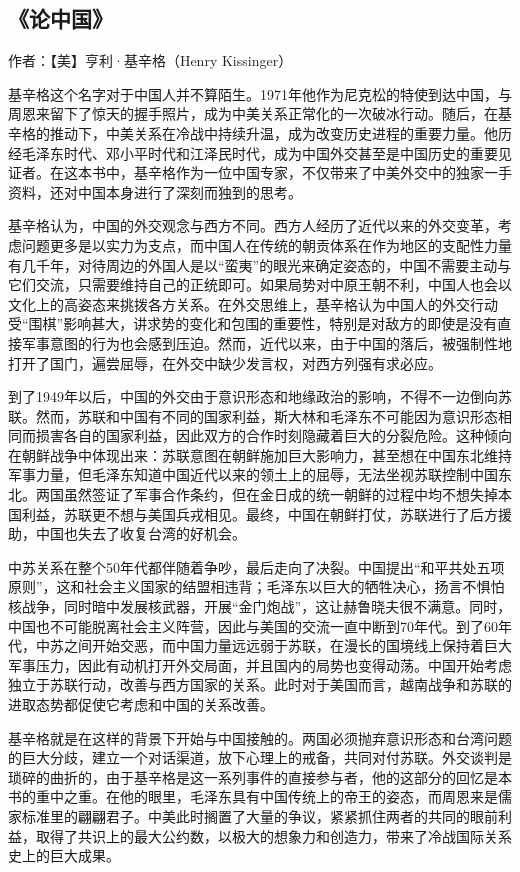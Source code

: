 \subsection{《论中国》}

作者：【美】亨利·基辛格（Henry Kissinger）

基辛格这个名字对于中国人并不算陌生。1971年他作为尼克松的特使到达中国，与周恩来留下了惊天的握手照片，成为中美关系正常化的一次破冰行动。随后，在基辛格的推动下，中美关系在冷战中持续升温，成为改变历史进程的重要力量。他历经毛泽东时代、邓小平时代和江泽民时代，成为中国外交甚至是中国历史的重要见证者。在这本书中，基辛格作为一位中国专家，不仅带来了中美外交中的独家一手资料，还对中国本身进行了深刻而独到的思考。

基辛格认为，中国的外交观念与西方不同。西方人经历了近代以来的外交变革，考虑问题更多是以实力为支点，而中国人在传统的朝贡体系在作为地区的支配性力量有几千年，对待周边的外国人是以“蛮夷”的眼光来确定姿态的，中国不需要主动与它们交流，只需要维持自己的正统即可。如果局势对中原王朝不利，中国人也会以文化上的高姿态来挑拨各方关系。在外交思维上，基辛格认为中国人的外交行动受“围棋”影响甚大，讲求势的变化和包围的重要性，特别是对敌方的即使是没有直接军事意图的行为也会感到压迫。然而，近代以来，由于中国的落后，被强制性地打开了国门，遍尝屈辱，在外交中缺少发言权，对西方列强有求必应。

到了1949年以后，中国的外交由于意识形态和地缘政治的影响，不得不一边倒向苏联。然而，苏联和中国有不同的国家利益，斯大林和毛泽东不可能因为意识形态相同而损害各自的国家利益，因此双方的合作时刻隐藏着巨大的分裂危险。这种倾向在朝鲜战争中体现出来：苏联意图在朝鲜施加巨大影响力，甚至想在中国东北维持军事力量，但毛泽东知道中国近代以来的领土上的屈辱，无法坐视苏联控制中国东北。两国虽然签证了军事合作条约，但在金日成的统一朝鲜的过程中均不想失掉本国利益，苏联更不想与美国兵戎相见。最终，中国在朝鲜打仗，苏联进行了后方援助，中国也失去了收复台湾的好机会。

中苏关系在整个50年代都伴随着争吵，最后走向了决裂。中国提出“和平共处五项原则”，这和社会主义国家的结盟相违背；毛泽东以巨大的牺牲决心，扬言不惧怕核战争，同时暗中发展核武器，开展“金门炮战”，这让赫鲁晓夫很不满意。同时，中国也不可能脱离社会主义阵营，因此与美国的交流一直中断到70年代。到了60年代，中苏之间开始交恶，而中国力量远远弱于苏联，在漫长的国境线上保持着巨大军事压力，因此有动机打开外交局面，并且国内的局势也变得动荡。中国开始考虑独立于苏联行动，改善与西方国家的关系。此时对于美国而言，越南战争和苏联的进取态势都促使它考虑和中国的关系改善。

基辛格就是在这样的背景下开始与中国接触的。两国必须抛弃意识形态和台湾问题的巨大分歧，建立一个对话渠道，放下心理上的戒备，共同对付苏联。外交谈判是琐碎的曲折的，由于基辛格是这一系列事件的直接参与者，他的这部分的回忆是本书的重中之重。在他的眼里，毛泽东具有中国传统上的帝王的姿态，而周恩来是儒家标准里的翩翩君子。中美此时搁置了大量的争议，紧紧抓住两者的共同的眼前利益，取得了共识上的最大公约数，以极大的想象力和创造力，带来了冷战国际关系史上的巨大成果。

